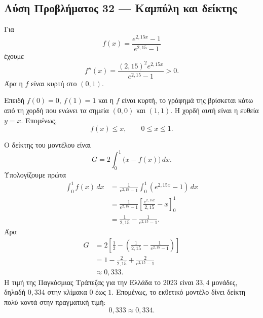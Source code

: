 \subsection*{Λύση Προβλήματος 32 --- Καμπύλη  και δείκτης }

\begin{alist}
  \item Για
        \[
          f(x)=\frac{e^{2{,}15x}-1}{e^{2{,}15}-1}
        \]
        έχουμε
        \[
          f''(x)=
          \frac{(2{,}15)^2e^{2{,}15x}}{e^{2{,}15}-1}>0.
        \]
        Άρα η $f$ είναι κυρτή στο $(0,1)$.

        Επειδή $f(0)=0$, $f(1)=1$ και η $f$ είναι κυρτή, το γράφημά της
        βρίσκεται κάτω από τη χορδή που ενώνει τα σημεία $(0,0)$ και
        $(1,1)$. Η χορδή αυτή είναι η ευθεία $y=x$. Επομένως,
        \[
          f(x)\leq x,\qquad 0\leq x\leq1.
        \]

  \item Ο δείκτης  του μοντέλου είναι
        \[
          G=2\int_0^1\bigl(x-f(x)\bigr)\,dx.
        \]
        Υπολογίζουμε πρώτα
        \begin{align*}
          \int_0^1 f(x)\,dx
          &=
          \frac{1}{e^{2{,}15}-1}
          \int_0^1\left(e^{2{,}15x}-1\right)\,dx\\
          &=
          \frac{1}{e^{2{,}15}-1}
          \left[
            \frac{e^{2{,}15x}}{2{,}15}-x
          \right]_0^1\\
          &=
          \frac{1}{2{,}15}
          -\frac{1}{e^{2{,}15}-1}.
        \end{align*}
        Άρα
        \begin{align*}
          G
          &=2\left[
            \frac12-
            \left(
              \frac{1}{2{,}15}
              -\frac{1}{e^{2{,}15}-1}
            \right)
          \right]\\
          &=
          1-\frac{2}{2{,}15}
          +\frac{2}{e^{2{,}15}-1}\\
          &\approx0{,}333.
        \end{align*}
        Η τιμή της Παγκόσμιας Τράπεζας για την Ελλάδα το 2023 είναι
        $33{,}4$ μονάδες, δηλαδή $0{,}334$ στην κλίμακα $0$ έως $1$.
        Επομένως, το εκθετικό μοντέλο δίνει δείκτη πολύ κοντά στην
        πραγματική τιμή:
        \[
          0{,}333\approx0{,}334.
        \]
\end{alist}
